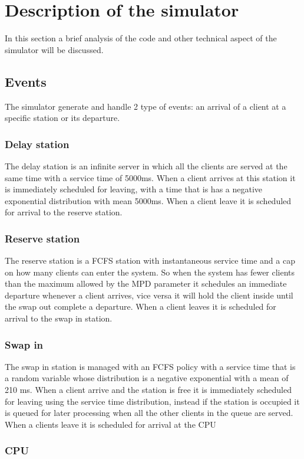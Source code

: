 \documentclass[12pt,a4paper]{article}
\begin{document}
\section{Description of the simulator}
In this section a brief analysis of the code and other technical aspect of the simulator will be discussed.
\subsection{Events}
The simulator generate and handle 2 type of events: an arrival of a client at a specific station or its departure.
\subsubsection{Delay station}
The delay station is an infinite server in which all the clients are served at the same time with a service time of 5000ms. When a client arrives at this station it is immediately scheduled for leaving, with a time that is has a negative exponential distribution with mean 5000ms. When a client leave it is scheduled for arrival to the reserve station.
\\
\subsubsection{Reserve station}
The reserve station is a FCFS station with instantaneous service time and a cap on how many clients can enter the system. So when the system has fewer clients than the maximum allowed by the MPD parameter it schedules an immediate departure whenever a client arrives, vice versa it will hold the client inside until the swap out complete a departure. When a client leaves it is scheduled for arrival to the swap in station.

\subsubsection{Swap in}
The swap in station is managed with an FCFS policy with a service time that is a random variable whose distribution is a negative exponential with a mean of 210 ms. When a client arrive and the station is free it is immediately scheduled for leaving using the service time distribution, instead if the station is occupied it is queued for later processing when all the other clients in the queue are served. When a clients leave it is scheduled for arrival at the CPU

\subsubsection{CPU}
\end{document}
